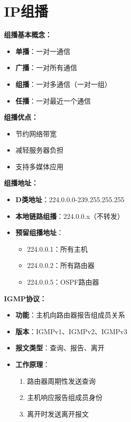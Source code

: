 \documentclass[lang=cn,newtx,10pt,scheme=chinese]{../../elegantbook}
\begin{document}
\section{IP组播}

\textbf{组播基本概念：}
\begin{itemize}
  \item \textbf{单播}：一对一通信
  \item \textbf{广播}：一对所有通信
  \item \textbf{组播}：一对多通信（一对一组）
  \item \textbf{任播}：一对最近一个通信
\end{itemize}

\textbf{组播优点：}
\begin{itemize}
  \item 节约网络带宽
  \item 减轻服务器负担
  \item 支持多媒体应用
\end{itemize}

\textbf{组播地址：}
\begin{itemize}
  \item \textbf{D类地址}：224.0.0.0-239.255.255.255
  \item \textbf{本地链路组播}：224.0.0.x（不转发）
  \item \textbf{预留组播地址}：
    \begin{itemize}
      \item 224.0.0.1：所有主机
      \item 224.0.0.2：所有路由器
      \item 224.0.0.5：OSPF路由器
    \end{itemize}
\end{itemize}

\textbf{IGMP协议：}
\begin{itemize}
  \item \textbf{功能}：主机向路由器报告组成员关系
  \item \textbf{版本}：IGMPv1、IGMPv2、IGMPv3
  \item \textbf{报文类型}：查询、报告、离开
  \item \textbf{工作原理}：
    \begin{enumerate}
      \item 路由器周期性发送查询
      \item 主机响应报告组成员身份
      \item 离开时发送离开报文
    \end{enumerate}
\end{itemize}
\end{document}
